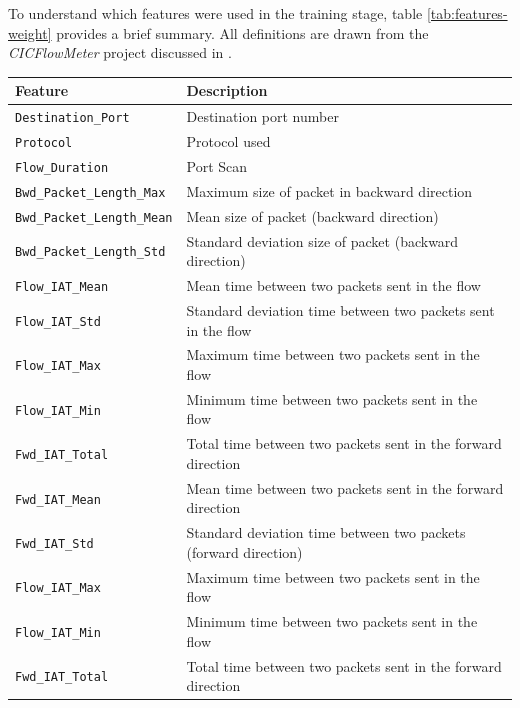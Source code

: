 \noindent To understand which features were used in the training stage, table \ref{tab:features-weight} provides a brief summary. All definitions are drawn from the \textit{CICFlowMeter} project discussed in \cite{icissp17}. \\

\begin{table}[h!]
    \centering
    \begin{tabular}{l|l}
        \toprule 
        Feature & Description \\
        \midrule
        \rowcolor{black!10} \texttt{Destination\_Port} & Destination port number  \\
        \texttt{Protocol} & Protocol used \\
        \rowcolor{black!10} \texttt{Flow\_Duration} & Port Scan \\
        \texttt{Bwd\_Packet\_Length\_Max} & Maximum size of packet in backward direction \\
        \rowcolor{black!10} \texttt{Bwd\_Packet\_Length\_Mean} & Mean size of packet (backward direction) \\
        \texttt{Bwd\_Packet\_Length\_Std} & Standard deviation size of packet (backward direction) \\
        \rowcolor{black!10} \texttt{Flow\_IAT\_Mean} & Mean time between two packets sent in the flow \\
        \texttt{Flow\_IAT\_Std} & Standard deviation time between two packets sent in the flow \\
        \rowcolor{black!10} \texttt{Flow\_IAT\_Max} & Maximum time between two packets sent in the flow \\
        \texttt{Flow\_IAT\_Min} & Minimum time between two packets sent in the flow \\
        \rowcolor{black!10} \texttt{Fwd\_IAT\_Total} & Total time between two packets sent in the forward direction \\
        \texttt{Fwd\_IAT\_Mean} & Mean time between two packets sent in the forward direction \\
        \rowcolor{black!10} \texttt{Fwd\_IAT\_Std} & Standard deviation time between two packets (forward direction) \\
        \texttt{Flow\_IAT\_Max} & Maximum time between two packets sent in the flow \\
        \rowcolor{black!10} \texttt{Flow\_IAT\_Min} & Minimum time between two packets sent in the flow \\
        \texttt{Fwd\_IAT\_Total} & Total time between two packets sent in the forward direction \\

\end{tabular}
\end{table}
